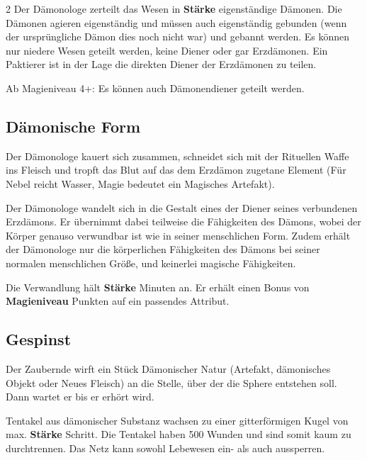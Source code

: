 \begin{multicols*}{2}
Der Dämonologe zerteilt das Wesen in \textbf{Stärke} eigenständige Dämonen. Die Dämonen agieren eigenständig und müssen auch eigenständig gebunden (wenn der ursprüngliche Dämon dies noch nicht war) und gebannt werden. Es können nur niedere Wesen geteilt werden, keine Diener oder gar Erzdämonen. Ein Paktierer ist in der Lage die direkten Diener der Erzdämonen zu teilen.

Ab Magieniveau 4+: Es können auch Dämonendiener geteilt werden.



\subsection{Dämonische Form}

Der Dämonologe kauert sich zusammen, schneidet sich mit der Rituellen Waffe ins Fleisch und tropft das Blut auf das dem Erzdämon zugetane Element (Für Nebel reicht Wasser, Magie bedeutet ein Magisches Artefakt).

Der Dämonologe wandelt sich in die Gestalt eines der Diener seines verbundenen Erzdämons. Er übernimmt dabei teilweise die Fähigkeiten des Dämons, wobei der Körper genauso verwundbar ist wie in seiner menschlichen Form. Zudem erhält der Dämonologe nur die körperlichen Fähigkeiten des Dämons bei seiner normalen menschlichen Größe, und keinerlei magische Fähigkeiten.

Die Verwandlung hält \textbf{Stärke} Minuten an. Er erhält einen Bonus von \textbf{Magieniveau} Punkten auf ein passendes Attribut.



\subsection{Gespinst}

Der Zaubernde wirft ein Stück Dämonischer Natur (Artefakt, dämonisches Objekt oder Neues Fleisch) an die Stelle, über der die Sphere entstehen soll. Dann wartet er bis er erhört wird.

Tentakel aus dämonischer Substanz wachsen zu einer gitterförmigen Kugel von max. \textbf{Stärke} Schritt. Die Tentakel haben 500 Wunden und sind somit kaum zu durchtrennen. Das Netz kann sowohl Lebewesen ein- als auch aussperren.


\end{multicols*}
